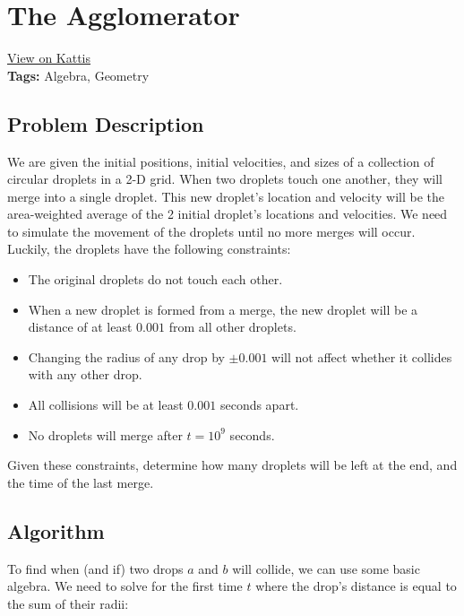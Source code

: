 \section{The Agglomerator}
\label{theagglomerator}
\href{https://open.kattis.com/problems/agglomerator}{View on Kattis}\\
\textbf{Tags:} Algebra, Geometry\\
\subsection{Problem Description}
We are given the initial positions, initial velocities, and sizes of a
collection of circular droplets in a 2-D grid. When two droplets touch one
another, they will merge into a single droplet. This new droplet's location and
velocity will be the area-weighted average of the 2 initial droplet's locations
and velocities. We need to simulate the movement of the droplets until no more
merges will occur. Luckily, the droplets have the following constraints:

\begin{itemize}
  \item The original droplets do not touch each other.
  \item When a new droplet is formed from a merge, the new droplet will be a
  distance of at least $0.001$ from all other droplets.
  \item Changing the radius of any drop by $\pm 0.001$ will not affect whether
  it collides with any other drop.
  \item All collisions will be at least $0.001$ seconds apart.
  \item No droplets will merge after $t = 10^{9}$ seconds.
\end{itemize}

Given these constraints, determine how many droplets will be left at the end,
and the time of the last merge.\\

\subsection{Algorithm}

To find when (and if) two drops $a$ and $b$ will collide, we can use some basic
algebra. We need to solve for the first time $t$ where the drop's distance is
equal to the sum of their radii:


